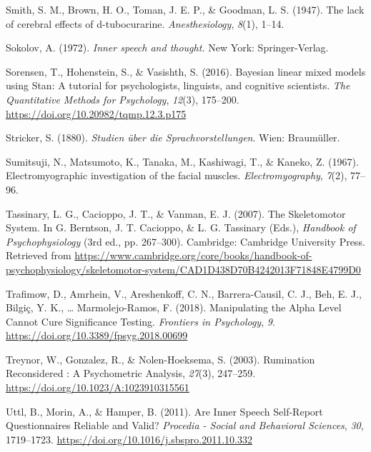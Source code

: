 \documentclass[a4paper,12pt,twoside,openright,oldfontcommands]{memoir}
\begin{document}
\hypertarget{ref-smith_lack_1947}{}
Smith, S. M., Brown, H. O., Toman, J. E. P., \& Goodman, L. S. (1947).
The lack of cerebral effects of d-tubocurarine. \emph{Anesthesiology},
\emph{8}(1), 1--14.

\hypertarget{ref-sokolov_inner_1972}{}
Sokolov, A. (1972). \emph{Inner speech and thought.} New York:
Springer-Verlag.

\hypertarget{ref-sorensen_bayesian_2016}{}
Sorensen, T., Hohenstein, S., \& Vasishth, S. (2016). Bayesian linear
mixed models using Stan: A tutorial for psychologists, linguists, and
cognitive scientists. \emph{The Quantitative Methods for Psychology},
\emph{12}(3), 175--200. \url{https://doi.org/10.20982/tqmp.12.3.p175}

\hypertarget{ref-stricker_studien_1880}{}
Stricker, S. (1880). \emph{Studien über die Sprachvorstellungen}. Wien:
Braumüller.

\hypertarget{ref-sumitsuji_electromyographic_1967}{}
Sumitsuji, N., Matsumoto, K., Tanaka, M., Kashiwagi, T., \& Kaneko, Z.
(1967). Electromyographic investigation of the facial muscles.
\emph{Electromyography}, \emph{7}(2), 77--96.

\hypertarget{ref-berntson_skeletomotor_2007}{}
Tassinary, L. G., Cacioppo, J. T., \& Vanman, E. J. (2007). The
Skeletomotor System. In G. Berntson, J. T. Cacioppo, \& L. G. Tassinary
(Eds.), \emph{Handbook of Psychophysiology} (3rd ed., pp. 267--300).
Cambridge: Cambridge University Press. Retrieved from
\url{https://www.cambridge.org/core/books/handbook-of-psychophysiology/skeletomotor-system/CAD1D438D70B4242013F71848E4799D0}

\hypertarget{ref-trafimow_manipulating_2018}{}
Trafimow, D., Amrhein, V., Areshenkoff, C. N., Barrera-Causil, C. J.,
Beh, E. J., Bilgiç, Y. K., \ldots{} Marmolejo-Ramos, F. (2018).
Manipulating the Alpha Level Cannot Cure Significance Testing.
\emph{Frontiers in Psychology}, \emph{9}.
\url{https://doi.org/10.3389/fpsyg.2018.00699}

\hypertarget{ref-treynor_rumination_2003}{}
Treynor, W., Gonzalez, R., \& Nolen-Hoeksema, S. (2003). Rumination
Reconsidered : A Psychometric Analysis, \emph{27}(3), 247--259.
\url{https://doi.org/10.1023/A:1023910315561}

\hypertarget{ref-Uttl2011}{}
Uttl, B., Morin, A., \& Hamper, B. (2011). Are Inner Speech Self-Report
Questionnaires Reliable and Valid? \emph{Procedia - Social and
Behavioral Sciences}, \emph{30}, 1719--1723.
\url{https://doi.org/10.1016/j.sbspro.2011.10.332}
\end{document}
